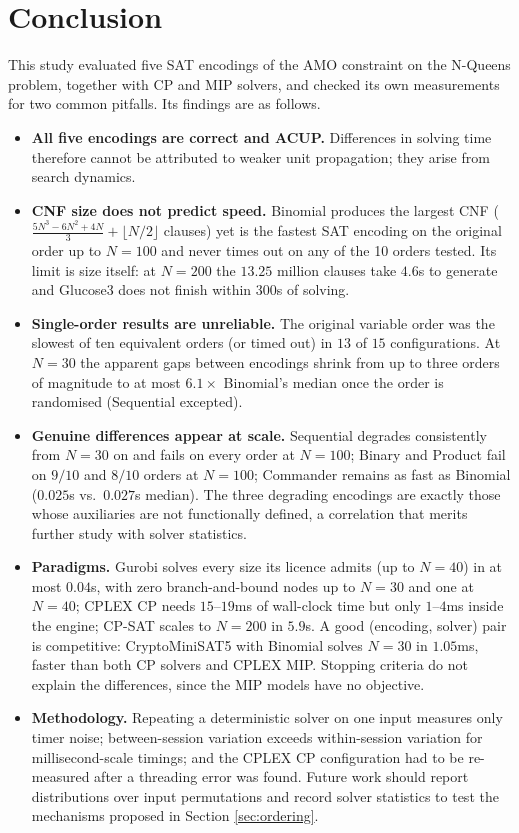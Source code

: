 \documentclass[a4paper,fleqn]{cas-sc}
\begin{document}
\section{Conclusion}
This study evaluated five SAT encodings of the AMO constraint on the N-Queens problem, together with CP and MIP solvers, and checked its own measurements for two common pitfalls. Its findings are as follows.

\begin{itemize}
    \setlength{\itemsep}{2pt}
    \setlength{\parskip}{0pt}
    \item \textbf{All five encodings are correct and ACUP.} Differences in solving time therefore cannot be attributed to weaker unit propagation; they arise from search dynamics.
    \item \textbf{CNF size does not predict speed.} Binomial produces the largest CNF ($\frac{5N^3-6N^2+4N}{3} + \lfloor N/2 \rfloor$ clauses) yet is the fastest SAT encoding on the original order up to $N=100$ and never times out on any of the 10 orders tested. Its limit is size itself: at $N=200$ the $13.25$ million clauses take $4.6$s to generate and Glucose3 does not finish within $300$s of solving.
    \item \textbf{Single-order results are unreliable.} The original variable order was the slowest of ten equivalent orders (or timed out) in $13$ of $15$ configurations. At $N=30$ the apparent gaps between encodings shrink from up to three orders of magnitude to at most $6.1\times$ Binomial's median once the order is randomised (Sequential excepted).
    \item \textbf{Genuine differences appear at scale.} Sequential degrades consistently from $N=30$ on and fails on every order at $N=100$; Binary and Product fail on $9/10$ and $8/10$ orders at $N=100$; Commander remains as fast as Binomial ($0.025$s vs.\ $0.027$s median). The three degrading encodings are exactly those whose auxiliaries are not functionally defined, a correlation that merits further study with solver statistics.
    \item \textbf{Paradigms.} Gurobi solves every size its licence admits (up to $N=40$) in at most $0.04$s, with zero branch-and-bound nodes up to $N=30$ and one at $N=40$; CPLEX CP needs $15$--$19$ms of wall-clock time but only $1$--$4$ms inside the engine; CP-SAT scales to $N=200$ in $5.9$s. A good (encoding, solver) pair is competitive: CryptoMiniSAT5 with Binomial solves $N=30$ in $1.05$ms, faster than both CP solvers and CPLEX MIP. Stopping criteria do not explain the differences, since the MIP models have no objective.
    \item \textbf{Methodology.} Repeating a deterministic solver on one input measures only timer noise; between-session variation exceeds within-session variation for millisecond-scale timings; and the CPLEX CP configuration had to be re-measured after a threading error was found. Future work should report distributions over input permutations and record solver statistics to test the mechanisms proposed in Section \ref{sec:ordering}.
\end{itemize}
\end{document}
